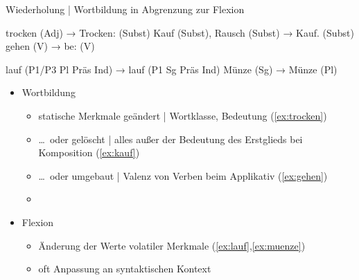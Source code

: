 \begin{frame}
  {Wiederholung | Wortbildung in Abgrenzung zur Flexion}
  \pause
  \begin{exe}
    \ex
    \begin{xlist}
      \ex trocken (Adj) → \alert{Trocken}: (Subst)\label{ex:trocken}
      \ex Kauf (Subst), Rausch (Subst) → \alert{Kauf}. (Subst)\label{ex:kauf}
      \ex gehen (V) → \alert{be}: (V)\label{ex:gehen}
    \end{xlist}
    \pause
    \ex
    \begin{xlist}
      \ex \alert{lauf} (P1\slash P3 Pl Präs Ind) → \alert{lauf} (P1 Sg Präs Ind)\label{ex:lauf}
      \ex \alert{Münze} (Sg) → \alert{Münze} (Pl)\label{ex:muenze}
    \end{xlist}
  \end{exe}
  \pause
  \Halbzeile
  \begin{itemize}[<+->]
    \item Wortbildung
      \begin{itemize}[<+->]
        \item statische Merkmale geändert | Wortklasse, Bedeutung \alert{(\ref{ex:trocken})}
        \item \ldots\ oder gelöscht | alles außer der Bedeutung des Erstglieds bei Komposition \alert{(\ref{ex:kauf})}
        \item \ldots\ oder umgebaut | Valenz von Verben beim Applikativ \alert{(\ref{ex:gehen})}
        \item {}
      \end{itemize}
  \Halbzeile
    \item Flexion
      \begin{itemize}
        \item Änderung der Werte volatiler Merkmale \alert{(\ref{ex:lauf},\ref{ex:muenze})}
        \item \alert{oft Anpassung an syntaktischen Kontext}
      \end{itemize}
  \end{itemize}
\end{frame}




